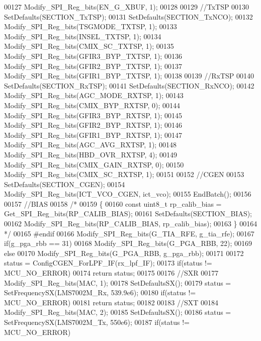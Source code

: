 \begin{DoxyCode}
00127     Modify_SPI_Reg_bits(EN_G_XBUF, 1);
00128 
00129     \textcolor{comment}{//TxTSP}
00130     SetDefaults(SECTION_TxTSP);
00131     SetDefaults(SECTION_TxNCO);
00132     Modify_SPI_Reg_bits(TSGMODE_TXTSP, 1);
00133     Modify_SPI_Reg_bits(INSEL_TXTSP, 1);
00134     Modify_SPI_Reg_bits(CMIX_SC_TXTSP, 1);
00135     Modify_SPI_Reg_bits(GFIR3_BYP_TXTSP, 1);
00136     Modify_SPI_Reg_bits(GFIR2_BYP_TXTSP, 1);
00137     Modify_SPI_Reg_bits(GFIR1_BYP_TXTSP, 1);
00138 
00139     \textcolor{comment}{//RxTSP}
00140     SetDefaults(SECTION_RxTSP);
00141     SetDefaults(SECTION_RxNCO);
00142     Modify_SPI_Reg_bits(AGC_MODE_RXTSP, 1);
00143     Modify_SPI_Reg_bits(CMIX_BYP_RXTSP, 0);
00144     Modify_SPI_Reg_bits(GFIR3_BYP_RXTSP, 1);
00145     Modify_SPI_Reg_bits(GFIR2_BYP_RXTSP, 1);
00146     Modify_SPI_Reg_bits(GFIR1_BYP_RXTSP, 1);
00147     Modify_SPI_Reg_bits(AGC_AVG_RXTSP, 1);
00148     Modify_SPI_Reg_bits(HBD_OVR_RXTSP, 4);
00149     Modify_SPI_Reg_bits(CMIX_GAIN_RXTSP, 0);
00150     Modify_SPI_Reg_bits(CMIX_SC_RXTSP, 1);
00151 
00152     \textcolor{comment}{//CGEN}
00153     SetDefaults(SECTION_CGEN);
00154     Modify_SPI_Reg_bits(ICT_VCO_CGEN, ict\_vco);
00155     EndBatch();
00156 
00157     \textcolor{comment}{//BIAS}
00158 \textcolor{comment}{/*}
00159 \textcolor{comment}{    \{}
00160 \textcolor{comment}{        const uint8\_t rp\_calib\_bias = Get\_SPI\_Reg\_bits(RP\_CALIB\_BIAS);}
00161 \textcolor{comment}{        SetDefaults(SECTION\_BIAS);}
00162 \textcolor{comment}{        Modify\_SPI\_Reg\_bits(RP\_CALIB\_BIAS, rp\_calib\_bias);}
00163 \textcolor{comment}{    \}}
00164 \textcolor{comment}{*/}
00165 \textcolor{preprocessor}{#endif}
00166     Modify_SPI_Reg_bits(G_TIA_RFE, g\_tia\_rfe);
00167     \textcolor{keywordflow}{if}(g\_pga\_rbb == 31)
00168         Modify_SPI_Reg_bits(G_PGA_RBB, 22);
00169     \textcolor{keywordflow}{else}
00170         Modify_SPI_Reg_bits(G_PGA_RBB, g\_pga\_rbb);
00171 
00172     status = ConfigCGEN_ForLPF_IF(rx\_lpf\_IF);
00173     \textcolor{keywordflow}{if}(status != MCU_NO_ERROR)
00174         \textcolor{keywordflow}{return} status;
00175 
00176     \textcolor{comment}{//SXR}
00177     Modify_SPI_Reg_bits(MAC, 1);
00178     SetDefaultsSX();
00179     status = SetFrequencySX(LMS7002M_Rx, 539.9e6);
00180     \textcolor{keywordflow}{if}(status != MCU_NO_ERROR)
00181         \textcolor{keywordflow}{return} status;
00182 
00183     \textcolor{comment}{//SXT}
00184     Modify_SPI_Reg_bits(MAC, 2);
00185     SetDefaultsSX();
00186     status = SetFrequencySX(LMS7002M_Tx, 550e6);
00187     \textcolor{keywordflow}{if}(status != MCU_NO_ERROR)

\end{DoxyCode}
